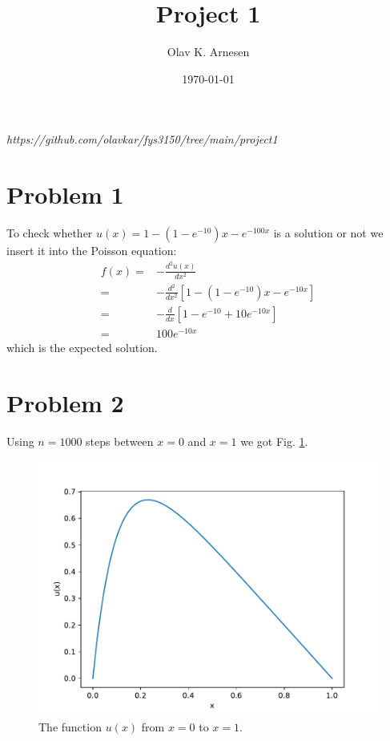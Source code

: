 \documentclass[english,notitlepage]{revtex4-2}  %
\begin{document}
\title{Project 1}      %
\author{Olav K. Arnesen}          %
\date{\today}                             %
\noaffiliation                            %

\maketitle 

\textit{https://github.com/olavkar/fys3150/tree/main/project1}

\section*{Problem 1}
To check whether $u(x)=1-(1-e^{-10})x-e^{-100x}$ is a solution or not we insert it into the Poisson equation:
\begin{equation}
	\begin{split}	
		f(x)=&-\frac{d^2u(x)}{dx^2} \\
		=&-\frac{d^2}{dx^2}\left[1-\left(1-e^{-10}\right)x-e^{-10x}\right] \\ 
		=&-\frac{d}{dx}\left[1-e^{-10}+10e^{-10x}\right] \\
		=&100e^{-10x}
	\end{split} 
\end{equation}
which is the expected solution.

\section*{Problem 2}
Using $n=1000$ steps between $x=0$ and $x=1$ we got Fig. \ref{fig:1}.

\begin{figure}
	\includegraphics[scale=0.9]{imgs/problem2_output.pdf}
	\caption{The function $u(x)$ from $x=0$ to $x=1$.}
	\label{fig:1}
\end{figure}
\end{document}
